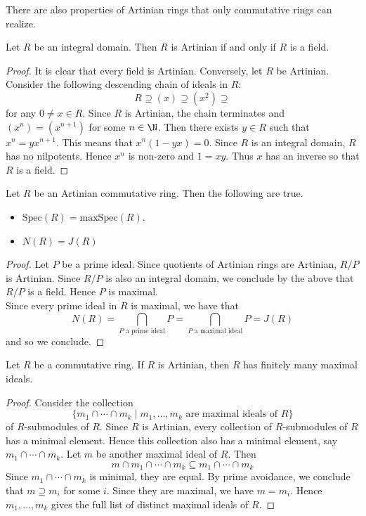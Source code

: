 \documentclass[a4paper]{article}
\begin{document}
There are also properties of Artinian rings that only commutative rings can realize. 

\begin{prp}{}{} Let $R$ be an integral domain. Then $R$ is Artinian if and only if $R$ is a field. 
\begin{proof}
It is clear that every field is Artinian. Conversely, let $R$ be Artinian. Consider the following descending chain of ideals in $R$: $$R\supseteq(x)\supseteq(x^2)\supseteq$$ for any $0\neq x\in R$. Since $R$ is Artinian, the chain terminates and $(x^n)=(x^{n+1})$ for some $n\in\N$. Then there exists $y\in R$ such that $x^n=yx^{n+1}$. This means that $x^n(1-yx)=0$. Since $R$ is an integral domain, $R$ has no nilpotents. Hence $x^n$ is non-zero and $1=xy$. Thus $x$ has an inverse so that $R$ is a field. 
\end{proof}
\end{prp}

\begin{prp}{}{} Let $R$ be an Artinian commutative ring. Then the following are true. 
\begin{itemize}
\item $\text{Spec}(R)=\text{maxSpec}(R)$. 
\item $N(R)=J(R)$
\end{itemize}
\begin{proof}
Let $P$ be a prime ideal. Since quotients of Artinian rings are Artinian, $R/P$ is Artinian. Since $R/P$ is also an integral domain, we conclude by the above that $R/P$ is a field. Hence $P$ is maximal. \\

Since every prime ideal in $R$ is maximal, we have that $$N(R)=\bigcap_{P\text{ a prime ideal}}P=\bigcap_{P\text{ a maximal ideal}}P=J(R)$$ and so we conclude. 
\end{proof}
\end{prp}

\begin{prp}{}{} Let $R$ be a commutative ring. If $R$ is Artinian, then $R$ has finitely many maximal ideals. 
\begin{proof}
Consider the collection $$\{m_1\cap\cdots\cap m_k\;|\;m_1,\dots,m_k\text{ are maximal ideals of }R\}$$ of $R$-submodules of $R$. Since $R$ is Artinian, every collection of $R$-submodules of $R$ has a minimal element. Hence this collection also has a minimal element, say $m_1\cap\cdots\cap m_k$. Let $m$ be another maximal ideal of $R$. Then $$m\cap m_1\cap\cdots\cap m_k\subseteq m_1\cap\cdots\cap m_k$$ Since $m_1\cap\cdots\cap m_k$ is minimal, they are equal. By prime avoidance, we conclude that $m\supseteq m_i$ for some $i$. Since they are maximal, we have $m=m_i$. Hence $m_1,\dots,m_k$ gives the full list of distinct maximal ideals of $R$. 
\end{proof}
\end{prp}
\end{document}
